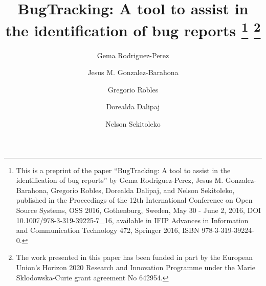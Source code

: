 \documentclass[runningheads,a4paper]{llncs}
\begin{document}
\mainmatter  %

\title{BugTracking: A tool to assist in the identification of bug reports
\thanks{This is a preprint of the paper ``BugTracking: A tool to assist in the identification of bug reports'' by Gema Rodriguez-Perez, Jesus M. Gonzalez-Barahona, Gregorio Robles, Dorealda Dalipaj, and Nelson Sekitoleko, published in the Proceedings of the 12th International Conference on Open Source Systems, OSS 2016, Gothenburg, Sweden, May 30 - June 2, 2016, DOI 10.1007/978-3-319-39225-7\_16, available in IFIP Advances in Information and Communication Technology 472, Springer 2016, ISBN 978-3-319-39224-0.}
\thanks{The work presented in this paper has been funded in part by the European Union’s Horizon 2020 Research and Innovation Programme under the Marie Sklodowska-Curie grant agreement No 642954.}}

%
%
\author{Gema Rodriguez-Perez \and Jesus M. Gonzalez-Barahona \and Gregorio Robles \and  Dorealda Dalipaj \and Nelson Sekitoleko}


%

\end{document}
